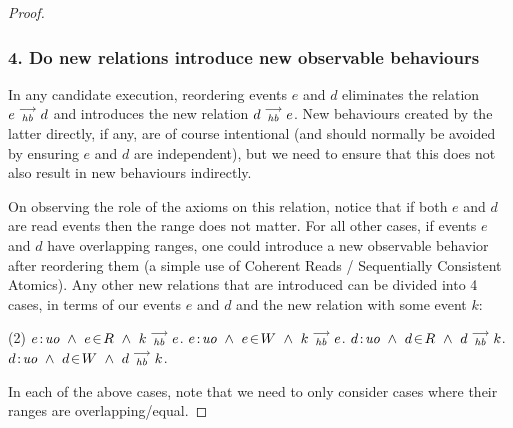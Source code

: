 \begin{proof}
    \subsubsection{4. Do new relations introduce new observable behaviours}
        In any candidate execution, reordering events $e$ and $d$ eliminates the relation $e\stackrel{\longrightarrow}{_{\textit{hb}}}d$ and introduces the new relation $d\stackrel{\longrightarrow}{_{\textit{hb}}}e$.  New behaviours created by the latter directly, if any, are 
        of course intentional (and should normally be avoided by ensuring $e$ and $d$ are independent), but we need to ensure that this does not also result in new behaviours indirectly.

        On observing the role of the axioms on this relation, notice that if both $e$ and $d$ are read events then the range does not matter. For all other cases, if events $e$ and $d$ have overlapping ranges, one could introduce a new observable behavior after reordering them (a simple use of Coherent Reads / Sequentially Consistent Atomics).        
        Any other new relations that are introduced can be divided into 4 cases, in terms of our events $e$ and $d$ and the new relation with some event $k$:
        \begin{tasks}(2)
            \task  $\et{e}{uo} \ \wedge \ \event{e}{R} \ \wedge \ \reln{k}{hb}{e}$.
            \task  $e\!:\!\textit{uo} \ \wedge \  e\!\in\!W \ \wedge \ k\stackrel{\longrightarrow}{_{\textit{hb}}}e$.
            \task  $\et{d}{uo} \ \wedge \  \event{d}{R} \ \wedge \ \reln{d}{hb}{k}$.
            \task  $d\!:\!\textit{uo} \ \wedge \ d\!\in\!W \ \wedge \ d\stackrel{\longrightarrow}{_{\textit{hb}}}k$.
        \end{tasks}
        In each of the above cases, note that we need to only consider cases where their ranges are overlapping/equal.
        

\end{proof}
